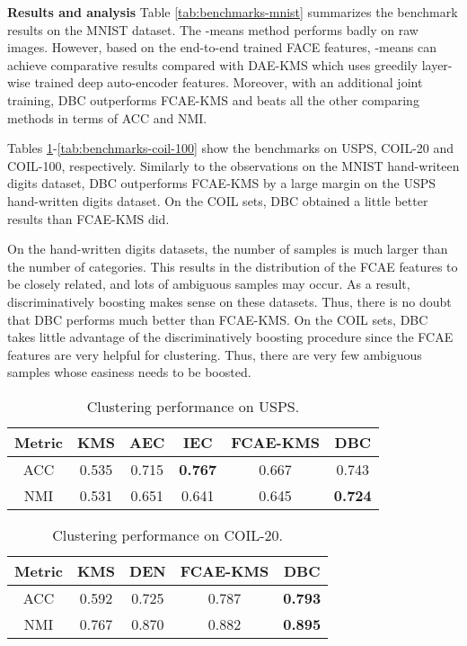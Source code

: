 \documentclass[preprint,12pt]{elsarticle}
\begin{document}
\textbf{Results and analysis} Table \ref{tab:benchmarks-mnist} summarizes the benchmark results on the MNIST dataset.
The -means method performs badly on raw images. However, based on the end-to-end trained FACE features, -means can achieve comparative results compared with DAE-KMS which uses greedily layer-wise trained
deep auto-encoder features. Moreover, with an additional joint training, DBC outperforms FCAE-KMS and beats
all the other comparing methods in terms of ACC and NMI.



Tables \ref{tab:benchmarks-usps}-\ref{tab:benchmarks-coil-100} show the benchmarks on USPS, COIL-20 and COIL-100,
respectively. Similarly to the observations on the MNIST hand-writeen digits dataset, DBC outperforms FCAE-KMS
by a large margin on the USPS hand-written digits dataset. On the COIL sets, DBC obtained a little better results
than FCAE-KMS did.

On the hand-written digits datasets, the number of samples is much larger than the number of categories.
This results in the distribution of the FCAE features to be closely related, and lots of ambiguous samples may occur.
As a result, discriminatively boosting makes sense on these datasets. Thus, there is no doubt that DBC performs
much better than FCAE-KMS. On the COIL sets, DBC takes little advantage of the discriminatively boosting procedure
since the FCAE features are very helpful for clustering. Thus, there are very few ambiguous samples whose easiness
needs to be boosted.

\begin{table}[!ht]
\centering
\begin{scriptsize}
\caption{Clustering performance on USPS.}
\label{tab:benchmarks-usps}
\begin{center}
\begin{tabular}{cccccc} \toprule
Metric & KMS & AEC & IEC & FCAE-KMS & DBC \\
\midrule
ACC & 0.535 & 0.715 & \textbf{0.767} & 0.667 & 0.743 \\
NMI & 0.531 & 0.651 & 0.641 & 0.645 & \textbf{0.724} \\
\bottomrule
\end{tabular}
\end{center}
\end{scriptsize}
\end{table}

\begin{table}[!ht]
\centering
\begin{scriptsize}
\caption{Clustering performance on COIL-20.}
\label{tab:benchmarks-coil}
\begin{center}
\begin{tabular}{ccccc} \toprule
Metric & KMS & DEN  & FCAE-KMS & DBC \\
\midrule
ACC & 0.592 & 0.725 & 0.787 & \textbf{0.793} \\
NMI & 0.767 & 0.870 & 0.882 & \textbf{0.895} \\
\bottomrule
\end{tabular}
\end{center}
\end{scriptsize}
\end{table}
\end{document}
